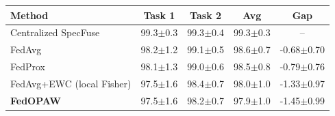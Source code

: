 \begin{tabular}{@{}lcccc@{}}
\toprule
Method & Task 1 & Task 2 & Avg & Gap \\
\midrule
Centralized SpecFuse & 99.3$\pm$0.3 & 99.3$\pm$0.4 & 99.3$\pm$0.3 & -- \\
FedAvg & 98.2$\pm$1.2 & 99.1$\pm$0.5 & 98.6$\pm$0.7 & -0.68$\pm$0.70 \\
FedProx & 98.1$\pm$1.3 & 99.0$\pm$0.6 & 98.5$\pm$0.8 & -0.79$\pm$0.76 \\
FedAvg+EWC (local Fisher) & 97.5$\pm$1.6 & 98.4$\pm$0.7 & 98.0$\pm$1.0 & -1.33$\pm$0.97 \\
\textbf{FedOPAW} & 97.5$\pm$1.6 & 98.2$\pm$0.7 & 97.9$\pm$1.0 & -1.45$\pm$0.99 \\
\bottomrule
\end{tabular}
